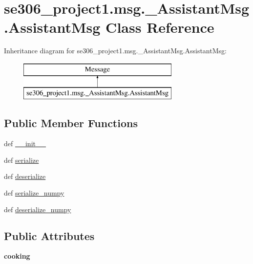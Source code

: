 \hypertarget{classse306__project1_1_1msg_1_1__AssistantMsg_1_1AssistantMsg}{\section{se306\-\_\-project1.\-msg.\-\_\-\-Assistant\-Msg.\-Assistant\-Msg Class Reference}
\label{classse306__project1_1_1msg_1_1__AssistantMsg_1_1AssistantMsg}
}
Inheritance diagram for se306\-\_\-project1.\-msg.\-\_\-\-Assistant\-Msg.\-Assistant\-Msg\-:\begin{figure}[H]
\begin{center}
\leavevmode
\includegraphics[height=2.000000cm]{classse306__project1_1_1msg_1_1__AssistantMsg_1_1AssistantMsg}
\end{center}
\end{figure}
\subsection*{Public Member Functions}
\begin{DoxyCompactItemize}
\item 
def \hyperlink{classse306__project1_1_1msg_1_1__AssistantMsg_1_1AssistantMsg_a301e2c6ab7ed4c48405f23e0992ad767}{\-\_\-\-\_\-init\-\_\-\-\_\-}
\item 
def \hyperlink{classse306__project1_1_1msg_1_1__AssistantMsg_1_1AssistantMsg_a8c4b6d99e72713a71f12f87c18ee2e06}{serialize}
\item 
def \hyperlink{classse306__project1_1_1msg_1_1__AssistantMsg_1_1AssistantMsg_aa8700e1054cba903da6a3e14051c4c04}{deserialize}
\item 
def \hyperlink{classse306__project1_1_1msg_1_1__AssistantMsg_1_1AssistantMsg_a6018ce827cc44ec27b28ef5c65380cfd}{serialize\-\_\-numpy}
\item 
def \hyperlink{classse306__project1_1_1msg_1_1__AssistantMsg_1_1AssistantMsg_a1572c60a75384a707bf4200a39a0a295}{deserialize\-\_\-numpy}
\end{DoxyCompactItemize}
\subsection*{Public Attributes}
\begin{DoxyCompactItemize}
\item 
\hypertarget{classse306__project1_1_1msg_1_1__AssistantMsg_1_1AssistantMsg_a7768eacfe92abe76d8497631b7f1b4ea}{{\bfseries cooking}}\label{classse306__project1_1_1msg_1_1__AssistantMsg_1_1AssistantMsg_a7768eacfe92abe76d8497631b7f1b4ea}

\end{DoxyCompactItemize}


